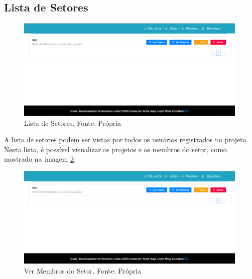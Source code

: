 \subsection{Lista de Setores}

\begin{figure}[H]
    \centering
    \includegraphics[width=1.0\textwidth]{figuras/lista_de_setores.png}
    \caption{Lista de Setores. Fonte: Própria}
    \label{img:lista_de_setores}
\end{figure}

A lista de setores podem ser vistas por todos os usuários registrados no projeto. Nesta lista, é possível visualizar os projetos e os membros do setor, como mostrado na imagem \ref{img:ver_membros_setores}:

\begin{figure}[H]
    \centering
    \includegraphics[width=1.0\textwidth]{figuras/lista_de_setores.png}
    \caption{Ver Membros do Setor. Fonte: Própria}
    \label{img:ver_membros_setores}
\end{figure}